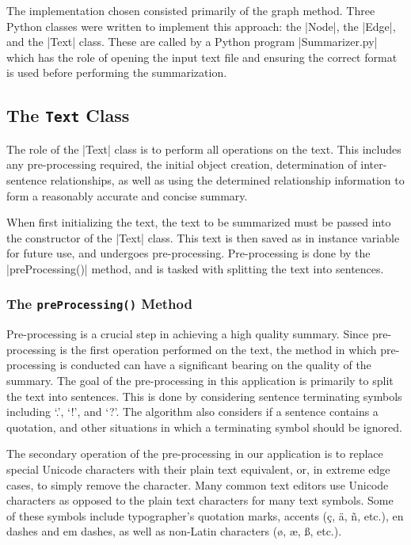 
The implementation chosen consisted primarily of the graph method. Three Python classes were written to implement this approach: the |Node|, the |Edge|, and the |Text| class. These are called by a Python program |Summarizer.py| which has the role of opening the input text file and ensuring the correct format is used before performing the summarization.


\subsection{The {\tt Text} Class}
	The role of the |Text| class is to perform all operations on the text. This includes any pre-processing required, the initial object creation, determination of inter-sentence relationships, as well as using the determined relationship information to form a reasonably accurate and concise summary.
	
	When first initializing the text, the text to be summarized must be passed into the constructor of the |Text| class. This text is then saved as in instance variable for future use, and undergoes pre-processing. Pre-processing is done by the |preProcessing()| method, and is tasked with splitting the text into sentences.
	
	\subsubsection{The {\tt preProcessing()} Method}
		Pre-processing is a crucial step in achieving a high quality summary. Since pre-processing is the first operation performed on the text, the method in which pre-processing is conducted can have a significant bearing on the quality of the summary. The goal of the pre-processing in this application is primarily to split the text into sentences. This is done by considering sentence terminating symbols including `.', `!', and `?'. The algorithm also considers if a sentence contains a quotation, and other situations in which a terminating symbol should be ignored.
		
		The secondary operation of the pre-processing in our application is to replace special Unicode characters with their plain text equivalent, or, in extreme edge cases, to simply remove the character. Many common text editors use Unicode characters as opposed to the plain text characters for many text symbols. Some of these symbols include typographer's quotation marks, accents (\eg \c c, \"a, \~n, etc.), en dashes and em dashes, as well as non-Latin characters (\eg \o, \ae, \ss, etc.). 
		

